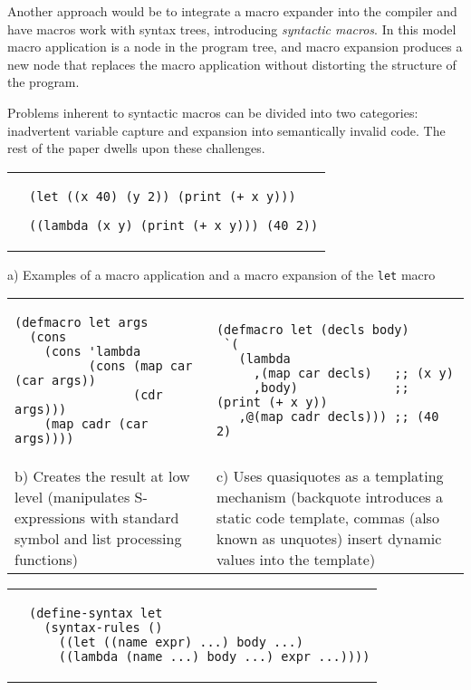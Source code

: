 \documentclass[10pt,journal,a4paper]{IEEEtran}
\begin{document}
Another approach would be to integrate a macro expander into the compiler and
have macros work with syntax trees, introducing \emph{syntactic macros}.
In this model macro application is a node in the program tree,
and macro expansion produces a new node that replaces the macro application
without distorting the structure of the program.

Problems inherent to syntactic macros can be divided into two categories:
inadvertent variable capture and expansion into semantically invalid code.
The rest of the paper dwells upon these challenges.

\begin{figure*}[t]
\begin{listing}
\normalsize

\begin{tabular}{p{4.0cm} p{15cm}}\\
 &
\begin{verbatim}
(let ((x 40) (y 2)) (print (+ x y)))

((lambda (x y) (print (+ x y))) (40 2))
\end{verbatim}
\end{tabular}

\begin{center}
a) Examples of a macro application and a macro expansion of the \texttt{let} macro
\end{center}

\begin{tabular}{p{8.5cm} p{8.5cm}}\\
\begin{verbatim}
(defmacro let args
  (cons
    (cons 'lambda
          (cons (map car (car args))
                (cdr args)))
    (map cadr (car args))))
\end{verbatim}
&
\begin{verbatim}
(defmacro let (decls body)
 `(
   (lambda
     ,(map car decls)   ;; (x y)
     ,body)             ;; (print (+ x y))
   ,@(map cadr decls))) ;; (40 2)
\end{verbatim}\\
b) Creates the result at low level (manipulates S-expressions
with standard symbol and list processing functions)
&
c) Uses quasiquotes \cite{bawden99} as a templating mechanism
(backquote introduces a static code template, commas (also known as
unquotes) insert dynamic values into the template)
\end{tabular}

\begin{tabular}{p{3.5cm} p{13.5cm}}\\
 &
\begin{verbatim}
(define-syntax let
  (syntax-rules ()
    ((let ((name expr) ...) body ...)
    ((lambda (name ...) body ...) expr ...))))
\end{verbatim}
\end{tabular}


\end{listing}
\end{figure*}
\end{document}
